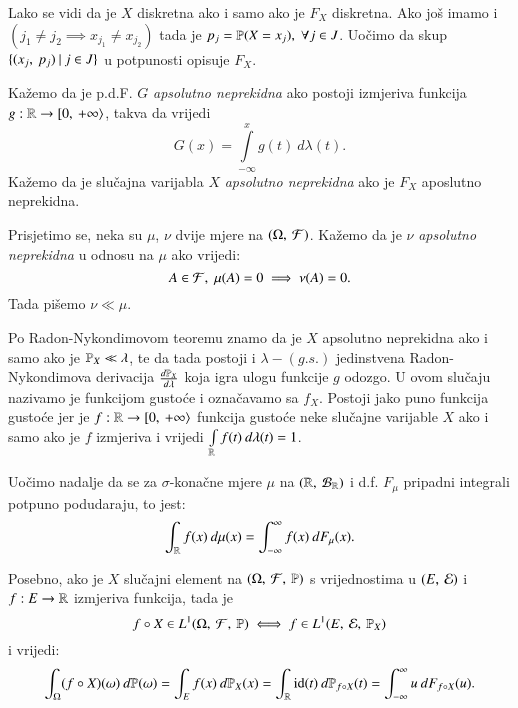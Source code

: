 Lako se vidi da je $X$ diskretna ako i samo ako je $F_X$ diskretna.
Ako jo\v s imamo i $(j_1 \neq j_2 \implies x_{j_1} \neq x_{j_2})$ tada je $p_j = \mathbb{P}({X = x_j}), \; \forall j \in J$.
Uo\v cimo da skup $\{{({x_j}, \: {p_j})} \: | \: {j \in J}\}$ u potpunosti opisuje $F_X$.

\begin{defn}    \label{defn:5.11-2}
Ka\v zemo da je p.d.F. $G$ \emph{apsolutno neprekidna} ako postoji izmjeriva funkcija $g : \mathbb{R} \to [ {0}, \: {+\infty} \rangle$, takva da vrijedi
\begin{equation*}
    G(x) = \int\limits_{-\infty}^{x} g(t) \: d \lambda (t).
\end{equation*}
Ka\v zemo da je slu\v cajna varijabla $X$ \emph{apsolutno neprekidna} ako je $F_X$ aposlutno neprekidna.
\end{defn}

\begin{nap} \label{nap:5.11-2}
    Prisjetimo se, neka su $\mu$, $\nu$ dvije mjere na $(\Omega, \: \mathcal{F})$. Ka\v zemo da je $\nu$ \emph{apsolutno neprekidna} u odnosu na $\mu$ ako vrijedi:
    \begin{equation*}
        A \in \mathcal{F}, \; \mu(A) = 0 \implies \nu (A) = 0.
    \end{equation*}
    Tada pi\v semo $\nu \ll \mu$.
\end{nap}

Po Radon-Nykondimovom teoremu znamo da je $X$ apsolutno neprekidna ako i samo ako je $\mathbb{P}_X \ll \lambda$, te da tada postoji i $\lambda-(g.s.)$ jedinstvena Radon-Nykondimova derivacija $\frac{d \mathbb{P}_X}{d \lambda}$ koja igra ulogu funkcije $g$ odozgo.
U ovom slu\v caju nazivamo je funkcijom gusto\' ce i ozna\v cavamo sa $f_X$.
Postoji jako puno funkcija gusto\' ce jer je $f: \mathbb{R} \to [ {0}, \: {+\infty} \rangle$ funkcija gusto\' ce neke slu\v cajne varijable $X$ ako i samo ako je $f$ izmjeriva i vrijedi $\int\limits_{\mathbb{R}} f(t) \: d \lambda (t) = 1$.

Uo\v cimo nadalje da se za $\sigma$-kona\v cne mjere $\mu$ na $({\mathbb{R}}, \: {\mathcal{B}_{\mathbb{R}}})$ i d.f. $F_{\mu}$ pripadni integrali potpuno podudaraju, to jest:
\begin{equation*}
    \int_{\mathbb{R}} f(x) \: d \mu (x) = \int_{-\infty}^{\infty} f(x) \: d F_{\mu} (x).
\end{equation*}

Posebno, ako je $X$ slu\v cajni element na $(\Omega, \: \mathcal{F}, \: \mathbb{P})$ s vrijednostima u $({E}, \: {\mathcal{E}})$ i $f:E \to \mathbb{R}$ izmjeriva funkcija, tada je
\begin{equation*}
    f \circ X \in L^1 (\Omega, \: \mathcal{F}, \: \mathbb{P}) \iff f \in L^1 (E, \: \mathcal{E}, \: \mathbb{P}_X)
\end{equation*}
i vrijedi:
\begin{equation*}
    \int_{\Omega} (f \circ X) (\omega) \: d \mathbb{P} (\omega)
    = \int_E f(x) \: d \mathbb{P}_X (x)
    = \int_{\mathbb{R}} \mathrm{id} (t) \: d \mathbb{P}_{f \circ X} (t)
    = \int_{-\infty}^{\infty} u \: d F_{f \circ X} (u).
\end{equation*}

